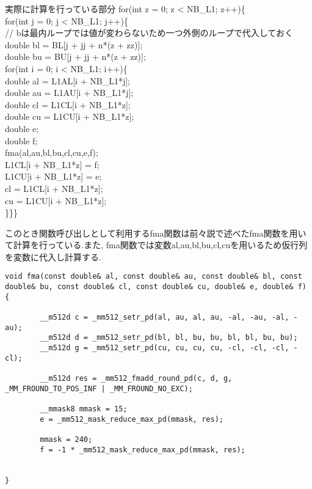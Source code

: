 \documentclass[11pt,a4paper]{jsreport}
\theoremstyle{definition}
\begin{document}
\begin{itembox}[l]{実際に計算を行っている部分}
for(int z = 0; z <  NB\_L1; z++)\{ \\
            for(int j = 0; j <  NB\_L1; j++)\{ \\
            // bは最内ループでは値が変わらないため一つ外側のループで代入しておく \\
                double bl = BL[j + jj + n*(z + zz)]; \\
                double bu = BU[j + jj + n*(z + zz)]; \\
            for(int i = 0; i <  NB\_L1; i++)\{ \\
                        double al = L1AL[i + NB\_L1*j]; \\
                        double au = L1AU[i + NB\_L1*j]; \\
                        double cl = L1CL[i + NB\_L1*z]; \\
                        double cu = L1CU[i + NB\_L1*z]; \\
                        double e; \\
                        double f; \\
                        fma(al,au,bl,bu,cl,cu,e,f); \\
                        L1CL[i + NB\_L1*z] = f; \\
                        L1CU[i + NB\_L1*z] = e; \\
                        cl = L1CL[i + NB\_L1*z]; \\
                        cu = L1CU[i + NB\_L1*z]; \\
            \}\}\}
\end{itembox}
このとき関数呼び出しとして利用するfma関数は前々説で述べたfma関数を用いて計算を行っている.また, fma関数では変数al,au,bl,bu,cl,cuを用いるため仮行列を変数に代入し計算する.
\begin{lstlisting}[caption = fma関数]
void fma(const double& al, const double& au, const double& bl, const double& bu, const double& cl, const double& cu, double& e, double& f)
{
    
        __m512d c = _mm512_setr_pd(al, au, al, au, -al, -au, -al, -au);
        __m512d d = _mm512_setr_pd(bl, bl, bu, bu, bl, bl, bu, bu);
        __m512d g = _mm512_setr_pd(cu, cu, cu, cu, -cl, -cl, -cl, -cl);

        __m512d res = _mm512_fmadd_round_pd(c, d, g, _MM_FROUND_TO_POS_INF | _MM_FROUND_NO_EXC);

        __mmask8 mmask = 15;
        e = _mm512_mask_reduce_max_pd(mmask, res);

        mmask = 240;
        f = -1 * _mm512_mask_reduce_max_pd(mmask, res);


}
\end{lstlisting}
\end{document}
